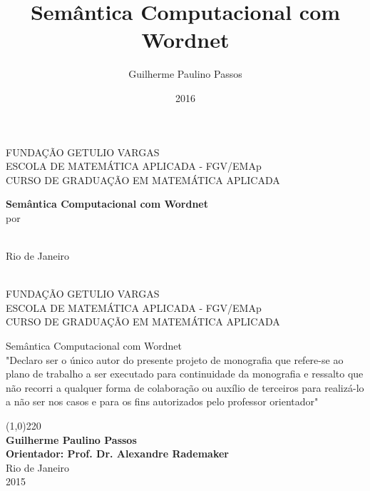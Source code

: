 \documentclass[12pt, a4paper, twoside]{article}
\title{Semântica Computacional com Wordnet} \newcommand{\usetitle}{Semântica Computacional com Wordnet}
\author{Guilherme Paulino Passos} \newcommand{\useauthor}{\Guilherme Paulino Passos}
\date{2016}
\newcommand{\update}{\todo[color=yellow]{Atualizado}}
\theoremstyle{definition}
\newcommand{\supervisor}{Alexandre Rademaker}
\begin{document}
\begin{titlepage}
 \begin{center}
  { \large FUNDAÇÃO GETULIO VARGAS}\\[0.3cm]
  { \large ESCOLA DE MATEMÁTICA APLICADA - FGV/EMAp}\\[0.5cm]
  { \large CURSO DE GRADUAÇÃO EM MATEMÁTICA APLICADA}\\[0.3cm]
 
  \vspace{55 mm}

  {\bf \large \usetitle}\update \\[1.2cm]

  { por}\\[0.6cm]
  {\large {\theauthor}}\\[0.1cm]


  \vspace{7cm}

  { Rio de Janeiro}\\[0.1cm]
  {\thedate}\\[0.6cm]
 \end{center}
\end{titlepage}

\begin{titlepage}
 
 \begin{center}
  {\large FUNDAÇÃO GETULIO VARGAS}\\[0.3cm]
  {\large ESCOLA DE MATEMÁTICA APLICADA - FGV/EMAp}\\[0.5cm]
  {\large CURSO DE GRADUAÇÃO EM MATEMÁTICA APLICADA}\\[0.3cm]


  \vspace{20 mm}


  {\large \usetitle}\\[2.1cm]

  
  "Declaro ser o único autor do presente projeto de monografia que refere-se ao
plano de trabalho a ser executado para continuidade da monografia e ressalto
que não recorri a qualquer forma de colaboração ou auxílio de terceiros para
realizá-lo a não ser nos casos e para os fins autorizados pelo professor orientador"

  \vspace{3.5cm}
  
  \line(1,0){220}\\[0.1cm]
  {\bf Guilherme Paulino Passos}\\[2cm]
  {\bf Orientador: Prof. Dr. \supervisor}\\[3cm]


  {Rio de Janeiro}\\[0.1cm]
  {2015}
 \end{center}
\end{titlepage}
\end{document}

